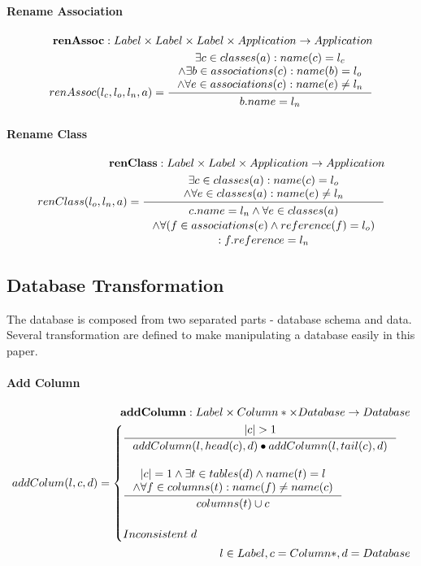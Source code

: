 \documentclass[11pt]{article}
\begin{document}
\paragraph{Rename Association}
\begin{align*}
	\mathbf{renAssoc} : Label \times Label \times Label \times Application \rightarrow Application \\
	renAssoc(l_c, l_o, l_n, a) = \inference{\exists c \in classes(a) : name(c) = l_c \\ \wedge \exists b \in associations(c) : name(b) = l_o \\ \wedge \forall e \in associations(c) : name(e) \neq l_n
	}{\begin{gathered}
		b.name = l_n 
	\end{gathered}}
\end{align*}
\paragraph{Rename Class}
\begin{align*}
	\mathbf{renClass} :  Label \times Label \times Application \rightarrow Application \\
	renClass(l_o, l_n, a) = \inference{\exists c \in classes(a) : name(c) = l_o \\ \wedge \forall e \in classes(a) : name(e) \neq l_n
	}{\begin{gathered}
		c.name = l_n \wedge \forall e \in classes(a) \\ \wedge \forall (f \in associations(e) \wedge reference(f) = l_o ) \\ : f.reference = l_n 
	\end{gathered}}
\end{align*}

\subsection{Database Transformation}
The database is composed from two separated parts - database schema and data. Several transformation are defined to make manipulating a database easily in this paper.
\paragraph{Add Column}
\begin{align*}
	\mathbf{addColumn} : Label \times Column* \times Database \rightarrow Database \\ 	
	addColum(l, c, d) = \begin{cases}
		\inference{|c| > 1}{addColumn(l, head(c), d) \bullet addColumn(l, tail(c), d)} \\ \\
		\inference{|c| = 1 \wedge \exists t \in tables(d) \wedge name(t) = l \\ \wedge \forall f \in columns(t) : name(f) \neq name(c)}{columns(t) \cup c}\\ \\
		Inconsistent \;d 
	 \end{cases}\\ 
	 l \in Label, c = Column*, d = Database
\end{align*}
\end{document}
